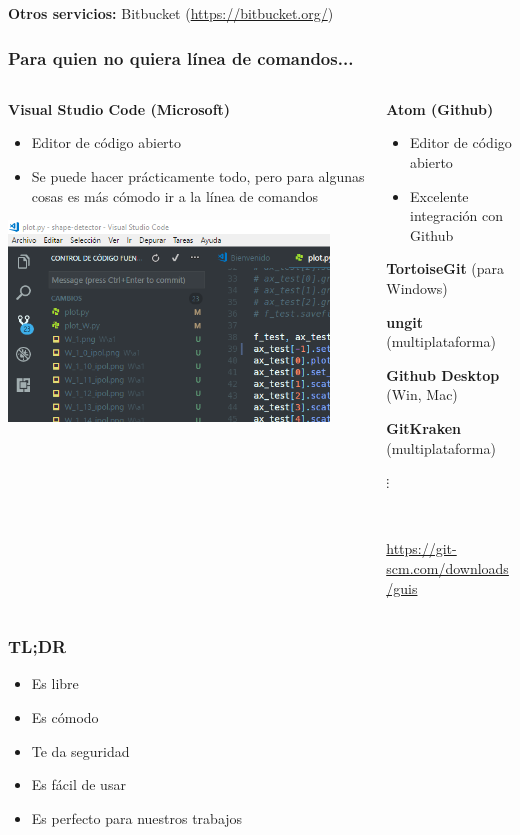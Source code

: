 \documentclass{beamer}
\begin{document}
\begin{frame}
\vspace{0.5cm}

\textbf{Otros servicios:} Bitbucket (\url{https://bitbucket.org/})

\end{frame}

\begin{frame}\frametitle{Para quien no quiera línea de comandos...}
	\begin{columns}
		\begin{column}[t]{0.5\textwidth}
			\textbf{Visual Studio Code (Microsoft)}
			\begin{itemize}
			\item Editor de código abierto
			\item Se puede hacer prácticamente todo, pero para algunas cosas es más cómodo ir a la línea de comandos
			\end{itemize}
			\medskip
			\centering
			\includegraphics[width=0.9\textwidth]{fig/vscode_git.png}
		\end{column}
		\begin{column}[t]{0.5\textwidth}
			\textbf{Atom (Github)}
			\begin{itemize}
			\item Editor de código abierto
			\item Excelente integración con Github
			\end{itemize}

			\textbf{TortoiseGit} (para Windows)
			
			\textbf{ungit} (multiplataforma)
			
			\textbf{Github Desktop} (Win, Mac)
			
			\textbf{GitKraken} (multiplataforma)
			
			\hspace{1cm}$\vdots$
			
			\
			
			\url{https://git-scm.com/downloads/guis}
		\end{column}
	\end{columns}
\end{frame}

\begin{frame}[standout]\frametitle{TL;DR}
	\begin{itemize}
		\item Es libre
		\item Es cómodo
		\item Te da seguridad
		\item Es fácil de usar
		\item Es perfecto para nuestros trabajos
	\end{itemize}
\end{frame}
\end{document}
